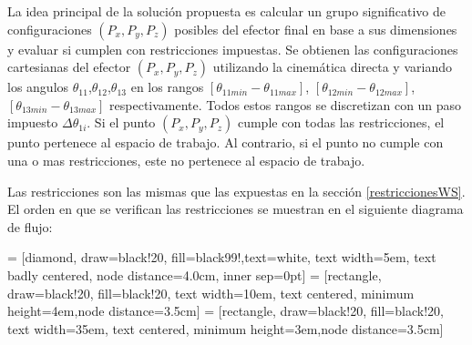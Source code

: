           \newpage     
    
     La idea principal de la solución propuesta es calcular un grupo significativo de configuraciones $(P_x,P_y,P_z)$ posibles del efector final en base a sus dimensiones y evaluar si cumplen con restricciones impuestas. Se obtienen las configuraciones cartesianas del efector $(P_x,P_y,P_z)$  utilizando la cinemática directa y variando los angulos $\theta_{11}$,$\theta_{12}$,$\theta_{13}$ en los rangos $[\theta_{11min}-\theta_{11max}]$, $[\theta_{12min}-\theta_{12max}]$, $[\theta_{13min}-\theta_{13max}]$ respectivamente. Todos estos rangos se discretizan con un paso impuesto \(  \Delta  \theta _{1i} \). Si el punto  $(P_x,P_y,P_z)$ cumple con todas las restricciones, el punto pertenece al espacio de trabajo. Al contrario, si el punto no cumple con una o mas restricciones, este no pertenece al espacio de trabajo.

    Las restricciones son las mismas que las expuestas en la sección \ref{restriccionesWS}. El orden en que se verifican las restricciones se muestran en el siguiente diagrama de flujo:

 = [diamond, draw=black!20, fill=black99!,text=white, 
    text width=5em, text badly centered, node distance=4.0cm, inner sep=0pt]
 = [rectangle, draw=black!20, fill=black!20, 
    text width=10em, text centered,   minimum height=4em,node distance=3.5cm]
 = [rectangle, draw=black!20, fill=black!20, 
    text width=35em, text centered,   minimum height=3em,node distance=3.5cm]
    

